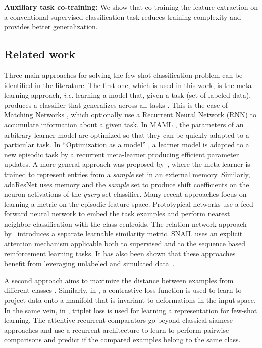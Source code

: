 \documentclass{article}
\begin{document}
\textbf{Auxiliary task co-training:} We show that co-training the feature extraction on a conventional supervised classification task reduces training complexity and provides better generalization.

\subsection{Related work} \label{ssec:related_work}
Three main approaches for solving the few-shot classification problem can be identified in the literature. The first one, which is used in this work, is the meta-learning approach, \emph{i.e.} learning a model that, given a task (set of labeled data), produces a classifier that generalizes across all tasks \citep{thrun1998lifelong, schmidhuber1997shifting}. This is the case of Matching Networks \citep{vinyals2016matching}, which optionally use a Recurrent Neural Network (RNN) to accumulate information about a given task. In MAML \citep{finn2017model}, the parameters of an arbitrary learner model are optimized so that they can be quickly adapted to a particular task. In ``Optimization as a model'' \citep{ravi2016optimization}, a learner model is adapted to a new episodic task by a recurrent meta-learner producing efficient parameter updates. A more general approach was proposed by~\citet{Santoro16metalearning}, where the meta-learner is trained to represent entries from a \emph{sample} set in an external memory. Similarly, adaResNet \citep{munkhdalai2018rapid} uses memory and the \emph{sample} set to produce shift coefficients on the neuron activations of the \emph{query} set classifier.
Many recent approaches focus on learning a metric on the episodic feature space. Prototypical networks \citep{snell2017prototypical} use a feed-forward neural network to embed the task examples and perform nearest neighbor classification with the class centroids. The relation network approach by~\citet{sung2018learning} introduces a separate learnable similarity metric. SNAIL \citep{mishra2018simle} uses an explicit attention mechanism applicable both to supervised and to the sequence based reinforcement learning tasks. It has also been shown that these approaches benefit from leveraging unlabeled and simulated data~\citep{ren2018meta, yuxiongwang2017imaginary}.

A second approach aims to maximize the distance between examples from different classes \citep{koch2015siamese}. Similarly, in \citep{hadsell2006dimensionality}, a contrastive loss function is used to learn to project data onto a manifold that is invariant to deformations in the input space. In the same vein, in \citep{fink2005object, schroff2015facenet, taigman2015web}, triplet loss is used for learning a representation for few-shot learning. The attentive recurrent comparators \citep{shyam2017attentive} go beyond classical siamese approaches and use a recurrent architecture to learn to perform pairwise comparisons and predict if the compared examples belong to the same class.
\end{document}

